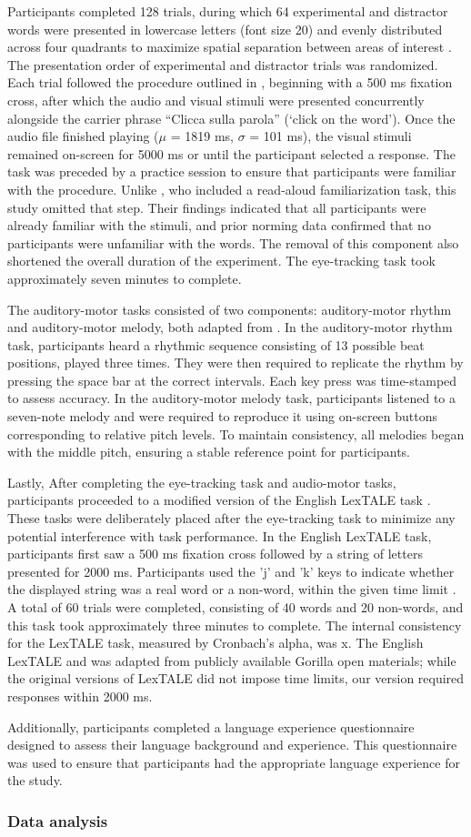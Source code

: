 Participants completed 128 trials, during which 64 experimental and distractor words were presented in lowercase letters (font size 20) and evenly distributed across four quadrants to maximize spatial separation between areas of interest \citep{bramlett_wiener_24-AOW}. The presentation order of experimental and distractor trials was randomized. Each trial followed the procedure outlined in \cite{Ge_et_al}, beginning with a 500 ms fixation cross, after which the audio and visual stimuli were presented concurrently alongside the carrier phrase “Clicca sulla parola” (‘click on the word’). Once the audio file finished playing ($\mu$ = 1819 ms, $\sigma$ = 101 ms), the visual stimuli remained on-screen for 5000 ms or until the participant selected a response. The task was preceded by a practice session to ensure that participants were familiar with the procedure. Unlike \cite{Ge_et_al}, who included a read-aloud familiarization task, this study omitted that step. Their findings indicated that all participants were already familiar with the stimuli, and prior norming data confirmed that no participants were unfamiliar with the words. The removal of this component also shortened the overall duration of the experiment. The eye-tracking task took approximately seven minutes to complete.

The auditory-motor tasks consisted of two components: auditory-motor rhythm and auditory-motor melody, both adapted from \citep{Kachlicka_Saito_Tierney_2019}. In the auditory-motor rhythm task, participants heard a rhythmic sequence consisting of 13 possible beat positions, played three times. They were then required to replicate the rhythm by pressing the space bar at the correct intervals. Each key press was time-stamped to assess accuracy. In the auditory-motor melody task, participants listened to a seven-note melody and were required to reproduce it using on-screen buttons corresponding to relative pitch levels. To maintain consistency, all melodies began with the middle pitch, ensuring a stable reference point for participants.

Lastly, After completing the eye-tracking task and audio-motor tasks, participants proceeded to a modified version of the English LexTALE task \citep{lemhofer2012introducing}. These tasks were deliberately placed after the eye-tracking task to minimize any potential interference with task performance. In the English LexTALE task, participants first saw a 500 ms fixation cross followed by a string of letters presented for 2000 ms. Participants used the 'j' and 'k' keys to indicate whether the displayed string was a real word or a non-word, within the given time limit \citep{lemhofer2012introducing}. A total of 60 trials were completed, consisting of 40 words and 20 non-words, and this task took approximately three minutes to complete. The internal consistency for the LexTALE task, measured by Cronbach’s alpha, was x. The English LexTALE and was adapted from publicly available Gorilla open materials; while the original versions of LexTALE did not impose time limits, our version required responses within 2000 ms.

Additionally, participants completed a language experience questionnaire designed to assess their language background and experience. This questionnaire was used to ensure that participants had the appropriate language experience for the study.

\subsubsection{Data analysis}